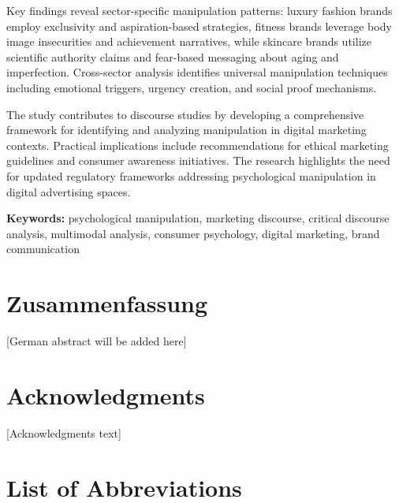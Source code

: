 \documentclass[12pt,a4paper,twoside,openright]{book}
\begin{document}
Key findings reveal sector-specific manipulation patterns: luxury fashion brands employ exclusivity and aspiration-based strategies, fitness brands leverage body image insecurities and achievement narratives, while skincare brands utilize scientific authority claims and fear-based messaging about aging and imperfection. Cross-sector analysis identifies universal manipulation techniques including emotional triggers, urgency creation, and social proof mechanisms.

The study contributes to discourse studies by developing a comprehensive framework for identifying and analyzing manipulation in digital marketing contexts. Practical implications include recommendations for ethical marketing guidelines and consumer awareness initiatives. The research highlights the need for updated regulatory frameworks addressing psychological manipulation in digital advertising spaces.

\textbf{Keywords:} psychological manipulation, marketing discourse, critical discourse analysis, multimodal analysis, consumer psychology, digital marketing, brand communication

\cleardoublepage
\chapter*{Zusammenfassung}

[German abstract will be added here]

\cleardoublepage
\chapter*{Acknowledgments}

[Acknowledgments text]

\cleardoublepage
\tableofcontents

\cleardoublepage
\listoffigures
{}

\cleardoublepage
\listoftables
{}

\cleardoublepage
\chapter*{List of Abbreviations}
\end{document}
